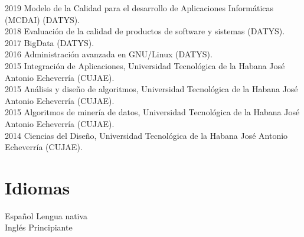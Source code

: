 \documentclass[letterpaper]{twentysecondcv} %
\begin{document}
\begin{twenty} %
\twentyitem
    	{2019}
		{}
        {Modelo de la Calidad para el desarrollo de Aplicaciones Informáticas (MCDAI) (DATYS).}
        {}
        {}
        {}
        \\
\twentyitem
    	{2018}
		{}
        {Evaluación de la calidad de productos de software y sistemas (DATYS).}
        {}
        {}
        {}
        \\
\twentyitem
    	{2017}
		{}
        {BigData (DATYS).}
        {}
        {}
        {}
        \\
\twentyitem
    	{2016}
		{}
        {Administración avanzada en GNU/Linux (DATYS).}
        {}
        {}
        {}
        \\
\twentyitem
    	{2015}
		{}
        {Integración de Aplicaciones, Universidad Tecnológica de la Habana José Antonio
Echeverría (CUJAE).}
        {}
        {}
        {}
        \\
\twentyitem
    	{2015}
		{}
        {Análisis y diseño de algoritmos, Universidad Tecnológica de la Habana José Antonio
Echeverría (CUJAE).}
        {}
        {}
        {}
        \\
\twentyitem
    	{2015}
		{}
        {Algoritmos de minería de datos, Universidad Tecnológica de la Habana José Antonio
Echeverría (CUJAE).}
        {}
        {}
        {}
        \\
\twentyitem
    	{2014}
		{}
        {Ciencias del Diseño, Universidad Tecnológica de la Habana José Antonio
Echeverría (CUJAE).}
        {}
        {}
        {}

\end{twenty}
\section{Idiomas}

\begin{twenty} %
\twentyitem
    	{Español}
		{}
        {Lengua nativa}
        {}
        {}
        {}
        \\
	\twentyitem
    	{Inglés}
		{}
        {Principiante}
        {}
        {}
        {}


\end{twenty}
\end{document}
